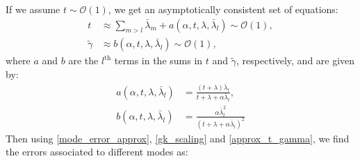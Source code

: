 \documentclass{article}
\begin{document}
If we assume $t\sim\mathcal{O}(1)$, we get an asymptotically consistent set of equations: %
\begin{align}\label{approx_t_gamma}
t&\approx \sum_{m > l}\bar\lambda_m + a(\alpha,t,\lambda,\bar\lambda_l) \sim \mathcal{O}(1),\nonumber \\
\tilde\gamma &\approx b(\alpha,t,\lambda,\bar\lambda_l) \sim \mathcal{O}(1),
\end{align}
where $a$ and $b$ are the $l^\text{th}$ terms in the sums in $t$ and $\tilde\gamma$, respectively, and are given by:
\begin{align}
    a(\alpha,t,\lambda,\bar\lambda_l) &= \frac{(t+\lambda)\bar\lambda_l}{t+\lambda+\alpha\bar\lambda_l},\nonumber\\
    b(\alpha,t,\lambda,\bar\lambda_l) &= \frac{\alpha \bar\lambda_l^2}{\left(t+\lambda+\alpha\bar\lambda_l\right)^2}
\end{align}
Then using \eqref{mode_error_approx}, \eqref{gk_scaling} and \eqref{approx_t_gamma}, we find the errors associated to different modes as:
%
\end{document}
